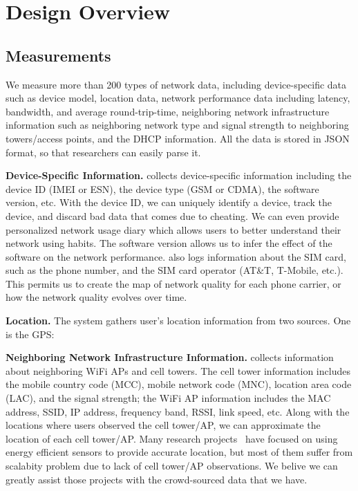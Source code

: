 \section{Design Overview}
\label{s:overview}

\subsection{Measurements}
We measure more than 200 types of network data, including device-specific data such as device model, 
location data, network performance data including latency, bandwidth, and average round-trip-time, 
neighboring network infrastructure information such as neighboring network type and signal strength to 
neighboring towers/access points, and the DHCP information. All the data is stored in JSON format, so
that researchers can easily parse it.


{\bfseries Device-Specific Information.} \name{} collects device-specific information including the device ID 
(IMEI or ESN), the device type (GSM or CDMA), the software version, etc. With the device ID, we can 
uniquely identify a device, track the device, and discard bad data that comes due to cheating. We can 
even provide personalized network usage diary which allows users to better understand their network 
using habits.
The software version allows us to infer the effect of the software on the network performance. \name{} also 
logs information about the SIM card, such as the phone number, and the SIM card operator (AT\&T, T-Mobile, etc.).
This permits us to create the map of network quality for each phone carrier, or how the network quality 
evolves over time.

{\bfseries Location.} The system gathers user's location information from two sources. One is the GPS:

{\bfseries Neighboring Network Infrastructure Information.} \name{} collects information about
neighboring WiFi APs and cell towers. The cell tower information includes the mobile country code (MCC), 
mobile network code (MNC), location area code (LAC), and the signal strength; the WiFi AP information
includes the MAC address, SSID, IP address, frequency band, RSSI, link speed, etc.
Along with the locations where users observed the cell tower/AP, we can approximate the location of 
each cell tower/AP. Many research projects~\cite{ctrack, vtrack-sensys09} have focused on using 
energy efficient sensors to provide accurate location, but most of them suffer from scalabity
problem due to lack of cell tower/AP observations. We belive we can greatly assist those projects
with the crowd-sourced data that we have. 

